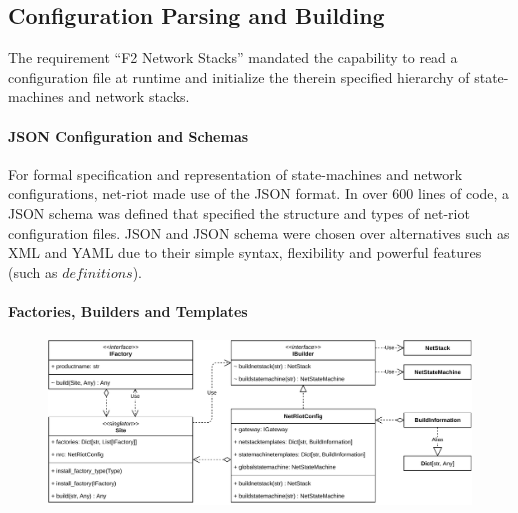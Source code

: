 

\subsection{Configuration Parsing and Building}
The requirement \enquote{F2 Network Stacks} mandated the capability to read a configuration file at runtime and initialize the therein specified hierarchy of state-machines and network stacks.

\paragraph{JSON Configuration and Schemas} For formal specification and representation of state-machines and network configurations, net-riot made use of the \ac{JSON} format. In over 600 lines of code, a \ac{JSON} schema was defined that specified the structure and types of net-riot configuration files. \ac{JSON} and \ac{JSON} schema were chosen over alternatives such as XML and YAML due to their simple syntax, flexibility and powerful features (such as $definitions$).

\paragraph{Factories, Builders and Templates}

\begin{figure}[h]
    \centering
    \includegraphics[width=14cm]{img/ch06/net-riot-factory.pdf}
    \label{fig:net-riot-factory}
\end{figure}

